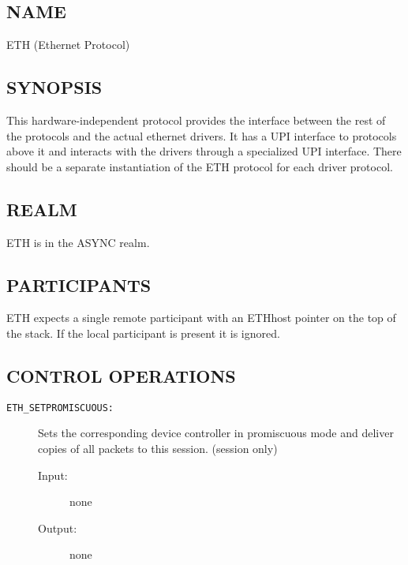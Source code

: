 %
%
%

\subsection*{NAME}

\noindent ETH (Ethernet Protocol)

\subsection*{SYNOPSIS}

\noindent 
This hardware-independent protocol 
provides the interface between the rest of the \xk{} protocols and the
actual ethernet drivers.  It has a UPI interface to protocols above it
and interacts with the drivers through a specialized UPI interface.
There should be a separate instantiation of the ETH protocol for each
driver protocol.

\subsection*{REALM}

ETH is in the ASYNC realm.

\subsection*{PARTICIPANTS}

ETH expects a single remote participant with an ETHhost pointer on the
top of the stack.  If the local participant is
present it is ignored.  

\subsection*{CONTROL OPERATIONS}

\begin{description}

\item[{\tt ETH\_SETPROMISCUOUS:}]
Sets the corresponding device controller in promiscuous mode and
deliver copies of all packets to this session.  (session only)
\begin{description}
\item[{\rm Input:}] none
\item[{\rm Output:}] none
\end{description}

\end{description}

